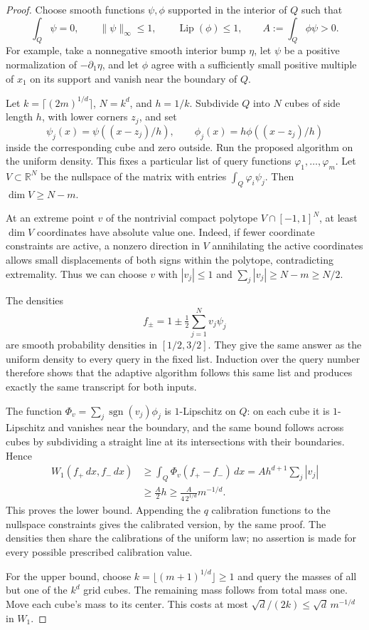 \documentclass[11pt,letterpaper]{article}
\theoremstyle{definition}
\theoremstyle{remark}
\newcommand{\1}{\mathbf 1}
\begin{document}
\begin{proof}
Choose smooth functions $\psi,\phi$ supported in the interior of $Q$ such
that
\[
 \int_Q\psi=0,\qquad \|\psi\|_\infty\leq1,\qquad
 \operatorname{Lip}(\phi)\leq1,\qquad
 A:=\int_Q\phi\psi>0.
\]
For example, take a nonnegative smooth interior bump $\eta$, let $\psi$ be
a positive normalization of $-\partial_1\eta$, and let $\phi$ agree with
a sufficiently small positive multiple of $x_1$ on its support and vanish
near the boundary of $Q$.

Let $k=\lceil(2m)^{1/d}\rceil$, $N=k^d$, and $h=1/k$.  Subdivide $Q$
into $N$ cubes of side length $h$, with lower corners $z_j$, and set
\[
 \psi_j(x)=\psi((x-z_j)/h),\qquad
 \phi_j(x)=h\phi((x-z_j)/h)
\]
inside the corresponding cube and zero outside.  Run the proposed algorithm
on the uniform density.  This fixes a particular list of query functions
$\varphi_1,\ldots,\varphi_m$.  Let $V\subset\mathbb R^N$ be the nullspace
of the matrix with entries $\int_Q\varphi_i\psi_j$.  Then
$\dim V\geq N-m$.

At an extreme point $v$ of the nontrivial compact polytope
$V\cap[-1,1]^N$, at least $\dim V$ coordinates have absolute value one.
Indeed, if fewer coordinate constraints are active, a nonzero direction in
$V$ annihilating the active coordinates allows small displacements of both
signs within the polytope, contradicting extremality.  Thus we can choose
$v$ with $|v_j|\leq1$ and $\sum_j|v_j|\geq N-m\geq N/2$.

The densities
\[
 f_\pm=1\pm\tfrac12\sum_{j=1}^N v_j\psi_j
\]
are smooth probability densities in $[1/2,3/2]$.  They give the same answer
as the uniform density to every query in the fixed list.  Induction over
the query number therefore shows that the adaptive algorithm follows this
same list and produces exactly the same transcript for both inputs.

The function $\Phi_v=\sum_j\operatorname{sgn}(v_j)\phi_j$ is
$1$-Lipschitz on $Q$: on each cube it is $1$-Lipschitz and vanishes near the
boundary, and the same bound follows across cubes by subdividing a straight
line at its intersections with their boundaries.  Hence
\begin{align*}
 W_1(f_+\,dx,f_-\,dx)
 &\geq\int_Q\Phi_v(f_+-f_-)\,dx
 =A h^{d+1}\sum_j|v_j|\\
 &\geq\frac{A}{2}h\geq\frac{A}{4\,2^{1/d}}m^{-1/d}.
\end{align*}
This proves the lower bound.  Appending the $q$ calibration functions to
the nullspace constraints gives the calibrated version, by the same proof.
The densities then share the calibrations of the uniform law; no assertion
is made for every possible prescribed calibration value.

For the upper bound, choose
$k=\lfloor(m+1)^{1/d}\rfloor\geq1$ and query the masses of all but one
of the $k^d$ grid cubes.  The remaining mass follows from total mass one.
Move each cube's mass to its center.  This costs at most
$\sqrt d/(2k)\leq\sqrt d\,m^{-1/d}$ in $W_1$.
\end{proof}
\end{document}
